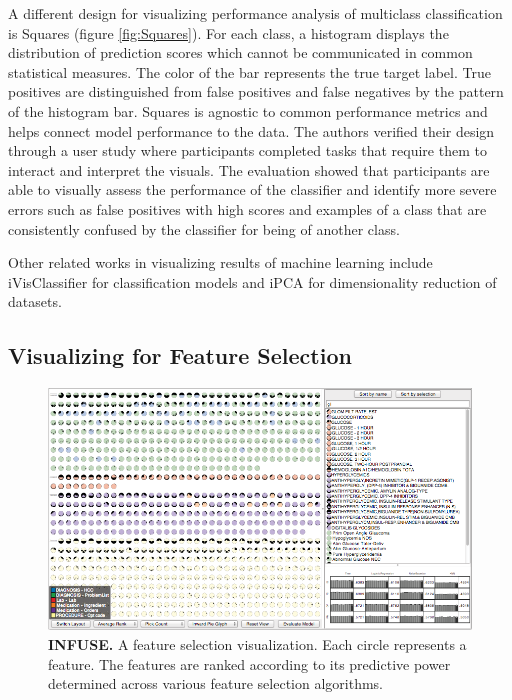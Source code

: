 A different design for visualizing performance analysis of multiclass classification is Squares \cite{Squares} (figure \ref{fig:Squares}). For each class, a histogram displays the distribution of prediction scores which cannot be communicated in common statistical measures. The color of the bar represents the true target label. True positives are distinguished from false positives and false negatives by the pattern of the histogram bar. Squares is agnostic to common performance metrics and helps connect model performance to the data. The authors verified their design through a user study where participants completed tasks that require them to interact and interpret the visuals. The evaluation showed that participants are able to visually assess the performance of the classifier and identify more severe errors such as false positives with high scores and examples of a class that are consistently confused by the classifier for being of another class.

Other related works in visualizing results of machine learning include iVisClassifier \cite{iVisClassifier} for classification models and iPCA \cite{iPCA} for dimensionality reduction of datasets.

\subsection{Visualizing for Feature Selection}
\begin{figure}[h]
\centering
\includegraphics[width=1\textwidth]{INFUSE}
\caption{ \textbf{INFUSE.} A feature selection visualization. Each circle represents a feature. The features are ranked according to its predictive power determined across various feature selection algorithms. }\label{fig:INFUSE}
\end{figure}

